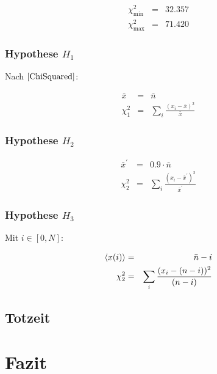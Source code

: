\documentclass[12pt,a4paper]{scrartcl}
\numberwithin{equation}{section} %
\renewcommand{\[}{} %
\renewcommand{\]}{\noindent} %
\begin{document}
\[
\begin{eqnarray}
    \chi^2_\mathrm{min} &=& 32.357 \\
    \chi^2_\mathrm{max} &=& 71.420
\end{eqnarray}
\]

\hypertarget{hypothese-h_1}{%
\subsubsection{\texorpdfstring{Hypothese
\(H_1\)}{Hypothese H\_1}}\label{hypothese-h_1}}

Nach \(\eqref{ChiSquared}\):

\[
\begin{eqnarray}
    \bar x &=& \bar n \\
    \chi^2_1 &=& \sum_i \frac{(x_i-\bar x)^2}{\bar x}
\end{eqnarray}
\]

\hypertarget{hypothese-h_2}{%
\subsubsection{\texorpdfstring{Hypothese
\(H_2\)}{Hypothese H\_2}}\label{hypothese-h_2}}

\[
\begin{eqnarray}
    \bar x^\prime &=& 0.9\cdot\bar n \\
    \chi^2_2 &=& \sum_i \frac{(x_i-\bar x^\prime)^2}{\bar x^\prime}
\end{eqnarray}
\]

\hypertarget{hypothese-h_3}{%
\subsubsection{\texorpdfstring{Hypothese
\(H_3\)}{Hypothese H\_3}}\label{hypothese-h_3}}

Mit \(i\in[0, N]\):

\[
\begin{eqnarray}
    \expval{x(i)} &=& \bar n - i \\
    \chi^2_2 &=& \sum_i \frac{(x_i-(n - i))^2}{(n - i)}
\end{eqnarray}
\]

\hypertarget{totzeit}{%
\subsection{Totzeit}\label{totzeit}}

\clearpage
\hypertarget{fazit}{%
\section{Fazit}\label{fazit}}
\end{document}
